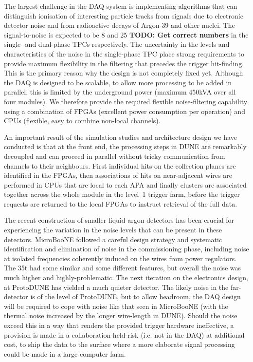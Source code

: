 The largest challenge in the DAQ system is implementing algorithms
that can distinguish ionisation of interesting particle tracks from
signals due to electronic detector noise and from radioactive decays
of Argon-39 and other nuclei.  The signal-to-noise is expected to be
8 and 25 {\bf TODO: Get correct numbers} in the single- and
dual-phase TPCs respectively. The uncertainty in the levels and
characteristics of the noise in the single-phase TPC place strong
requirements to provide maximum flexibility in the filtering that precedes
the trigger hit-finding. This is the primary reason why the design 
is not completely fixed yet.   Although the DAQ is designed to be scalable,
to allow more processing to be added in parallel, this is limited
by the underground power (maximum 450kVA over all four modules).
We therefore provide the required flexible noise-filtering capability
using a combination of FPGAs (excellent power consumption per operation)
and CPUs (flexible, easy to combine non-local channels).

An important result of the simulation studies and architecture design we
have conducted is that at the front end, the processing steps in DUNE are
remarkably decoupled and can proceed in parallel without tricky
communication from channels to their neighbours. First individual hits 
on the collection planes are identified in the FPGAs, then associations of
hits on near-adjacent wires are performed in CPUs that are local to
each APA and finally clusters are associated together across the whole
module in the level~1 trigger farm, before the trigger requests are
returned to the local FPGAs to instruct retrieval of the full data.

The recent construction of smaller liquid argon detectors has been
crucial for experiencing the variation in the noise levels that can be
present in these detectors.  MicroBooNE followed a careful design
strategy and systematic identification and elimination of noise in the
commissioning phase, including noise at isolated frequencies
coherently induced on the wires from power regulators.  The 35t had
some similar and some different features, but overall the noise was 
much higher and highly-problematic.  The next iteration on the
electronics design, at ProtoDUNE has yielded a much quieter detector.
The likely noise in the far-detector is of the level of ProtoDUNE, but
to allow headroom, the DAQ design will be required to cope with noise
like that seen in MicroBooNE (with the thermal noise increased by the
longer wire-length in DUNE).  Should the noise exceed this in a way
that renders the provided trigger hardware ineffective, a provision is
made in a collaboration-held-risk (i.e. not in the DAQ) at additional
cost, to ship the data to the surface where a more elaborate signal
processing could be made in a large computer farm.

